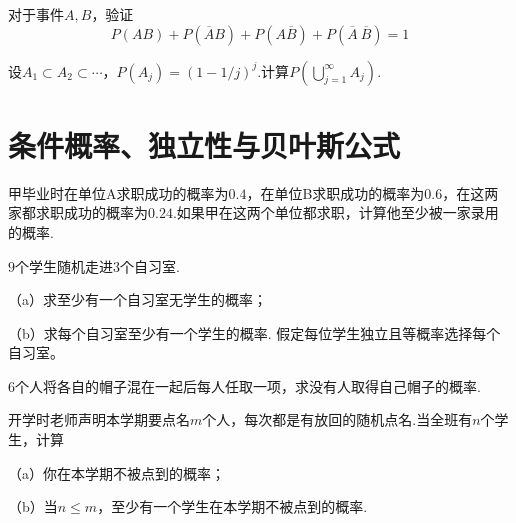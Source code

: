 \begin{exercise}[四个互斥区域的分割]\label{q:Y1.19}
对于事件$A,B$，验证
\[
P(AB)+P(\overline{A}B)+P(A\overline{B})+P(\overline{A}\:\overline{B})=1
\]\par{}\end{exercise}

\begin{exercise}[递增事件列的极限]\label{q:Y1.20}
设$A_1\subset A_2\subset \cdots$，$P(A_j)=(1-1/j)^j$.计算$P(\bigcup\limits_{j = 1}^\infty  {{A_j}} )$.\par{}\end{exercise}

\clearpage\section{条件概率、独立性与贝叶斯公式}

\begin{exercise}[至少一次求职成功]\label{q:Y2.1}
甲毕业时在单位A求职成功的概率为$0.4$，在单位B求职成功的概率为$0.6$，在这两家都求职成功的概率为$0.24$.如果甲在这两个单位都求职，计算他至少被一家录用的概率.\par{}\end{exercise}

\begin{exercise}[自习室占用问题]\label{q:Y2.2}
$9$个学生随机走进$3$个自习室.

（a）求至少有一个自习室无学生的概率；

（b）求每个自习室至少有一个学生的概率. 假定每位学生独立且等概率选择每个自习室。\par{}\end{exercise}

\begin{exercise}[无人拿到自己帽子]\label{q:Y2.3}
$6$个人将各自的帽子混在一起后每人任取一项，求没有人取得自己帽子的概率.\par{}\end{exercise}

\begin{exercise}[有放回点名的覆盖概率]\label{q:Y2.4}
开学时老师声明本学期要点名$m$个人，每次都是有放回的随机点名.当全班有$n$个学生，计算

（a）你在本学期不被点到的概率；

（b）当$n\leqslant m$，至少有一个学生在本学期不被点到的概率.\par{}\end{exercise}

